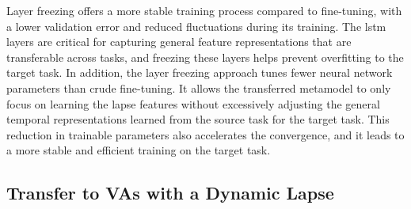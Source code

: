 Layer freezing offers a more stable training process compared to fine-tuning, with a lower validation error and reduced fluctuations during its training.
The \gls{lstm} layers are critical for capturing general feature representations that are transferable across tasks, and freezing these layers helps prevent overfitting to the target task.
In addition, the layer freezing approach tunes fewer neural network parameters than crude fine-tuning.
It allows the transferred metamodel to only focus on learning the lapse features without excessively adjusting the general temporal representations learned from the source task for the target task.
This reduction in trainable parameters also accelerates the convergence, and it leads to a more stable and efficient training on the target task.

\subsection{Transfer to VAs with a Dynamic Lapse}

